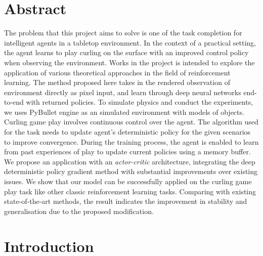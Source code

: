 \documentclass[oneside,11pt,a4paper]{article}
\begin{document}
\clearpage
\maketitle
\vspace{-5.5em}
\begingroup
\fontsize{9pt}{11pt}\selectfont
\tableofcontents
\endgroup
\clearpage
{}



\section{Abstract}

The problem that this project aims to solve is one of the task completion for intelligent agents in a tabletop environment. In the context of a practical setting, the agent learns to play curling on the surface with an improved control policy when observing the environment. Works in the project is intended to explore the application of various theoretical approaches in the field of reinforcement learning. The method proposed here takes in the rendered observation of environment directly as pixel input, and learn through deep neural networks end-to-end with returned policies. To simulate physics and conduct the experiments, we uses PyBullet \cite{pybullet} engine as an simulated environment with models of objects. Curling game play involves continuous control over the agent. The algorithm used for the task needs to update agent's deterministic policy for the given scenarios to improve convergence. During the training process, the agent is enabled to learn from past experiences of play to update current policies using a memory buffer. We propose an application with an \textit{actor-critic} architecture, integrating the deep deterministic policy gradient method with substantial improvements over existing issues. We show that our model can be successfully applied on the curling game play task like other classic reinforcement learning tasks. Comparing with existing state-of-the-art methods, the result indicates the improvement in stability and generalisation due to the proposed modification.
\vspace{0.5cm}

\section{Introduction}
\end{document}
